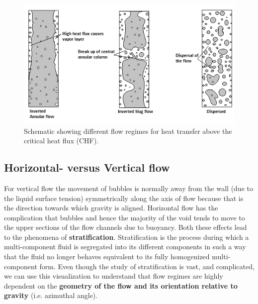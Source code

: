\documentclass[11pt,letterpaper,titlepage]{article}
\begin{document}
	\begin{center}
		\begin{minipage}[c]{0.85\textwidth}	
			\begin{figure}[H]
			
				\includegraphics{CHF_FlowRegimePattern.png}
				\caption{Schematic showing different flow regimes for heat transfer above the critical heat flux (CHF).}
				\label{figure:CHF_FlowRegimePattern}
			\end{figure}
		\end{minipage}
	\end{center}
\vspace{0.5cm}


\subsection{Horizontal- versus Vertical flow}
For vertical flow the movement of bubbles is normally away from the wall (due to the liquid surface tension) symmetrically along the axis of flow because that is the direction towards which gravity is aligned. Horizontal flow has the complication that bubbles and hence the majority of the void tends to move to the upper sections of the flow channels due to buoyancy. Both these effects lead to the phenomena of \textbf{stratification}. Stratification is the process during which a multi-component fluid is segregated into its different components in such a way that the fluid no longer behaves equivalent to its fully homogenized multi-component form. Even though the study of stratification is vast, and complicated, we can use this visualization to understand that flow regimes are highly dependent on the \textbf{geometry of the flow and its orientation relative to gravity} (i.e. azimuthal angle).
\end{document}
